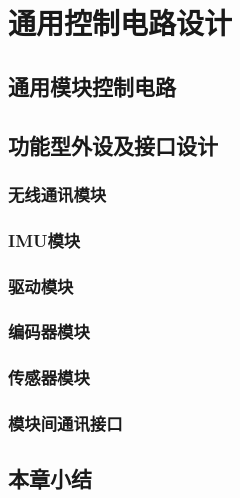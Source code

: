 

\chapter{通用控制电路设计}
\label{chap:electricalSystem}
\section{通用模块控制电路}
\section{功能型外设及接口设计}
\subsection{无线通讯模块}
\subsection{IMU模块}
\subsection{驱动模块}
\subsection{编码器模块}
\subsection{传感器模块}
\subsection{模块间通讯接口}
\section{本章小结}


